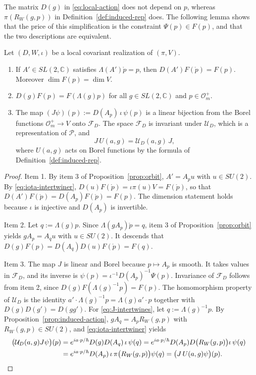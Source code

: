 The matrix $D(g)$ in \eqref{eq:local-action} does not depend on $p$, whereas $\pi(R_W(g,p))$ in Definition~\ref{def:induced-rep} does. The following lemma shows that the price of this simplification is the constraint $\Psi(p)\in F(p)$, and that the two descriptions are equivalent.

\begin{lemma}\label{lem:local-realization}
	Let $(D,W,\iota)$ be a local covariant realization of $(\pi,V)$.
	\begin{enumerate}
		\item If $A'\in SL(2,\mathbb{C})$ satisfies $\Lambda(A')\mathring{p}=p$, then $D(A')F(\mathring{p})=F(p)$. Moreover $\dim F(p)=\dim V$.
		\item $D(g)F(p)=F(\Lambda(g)p)$ for all $g\in SL(2,\mathbb{C})$ and $p\in\mathcal{O}_m^+$.
		\item The map $(J\psi)(p):=D(A_p)\,\iota\,\psi(p)$ is a linear bijection from the Borel functions $\mathcal{O}_m^+\to V$ onto $\mathcal{F}_D$. The space $\mathcal{F}_D$ is invariant under $\mathcal{U}_D$, which is a representation of $\mathcal{P}$, and
		\begin{equation}\label{eq:J-intertwines}
			J\,U(a,g)=\mathcal{U}_D(a,g)\,J,
		\end{equation}
		where $U(a,g)$ acts on Borel functions by the formula of Definition~\ref{def:induced-rep}.
	\end{enumerate}
\end{lemma}

\begin{proof}
	Item 1. By item 3 of Proposition~\ref{prop:orbit}, $A'=A_pu$ with $u\in SU(2)$. By \eqref{eq:iota-intertwiner}, $D(u)F(\mathring{p})=\iota\pi(u)V=F(\mathring{p})$, so that $D(A')F(\mathring{p})=D(A_p)F(\mathring{p})=F(p)$. The dimension statement holds because $\iota$ is injective and $D(A_p)$ is invertible.
	
	Item 2. Let $q:=\Lambda(g)p$. Since $\Lambda(gA_p)\mathring{p}=q$, item 3 of Proposition~\ref{prop:orbit} yields $gA_p=A_qu$ with $u\in SU(2)$. It descends that $D(g)F(p)=D(A_q)D(u)F(\mathring{p})=F(q)$.
	
	Item 3. The map $J$ is linear and Borel because $p\mapsto A_p$ is smooth. It takes values in $\mathcal{F}_D$, and its inverse is $\psi(p)=\iota^{-1}D(A_p)^{-1}\Psi(p)$. Invariance of $\mathcal{F}_D$ follows from item 2, since $D(g)F(\Lambda(g)^{-1}p)=F(p)$. The homomorphism property of $\mathcal{U}_D$ is the identity $a'\cdot\Lambda(g)^{-1}p=\Lambda(g)a'\cdot p$ together with $D(g)D(g')=D(gg')$. For \eqref{eq:J-intertwines}, let $q:=\Lambda(g)^{-1}p$. By Proposition~\ref{prop:induced-action}, $gA_q=A_pR_W(g,p)$ with $R_W(g,p)\in SU(2)$, and \eqref{eq:iota-intertwiner} yields
	\begin{align*}
		\big(\mathcal{U}_D(a,g)J\psi\big)(p)&=e^{ia\cdot p/\hbar}D(g)D(A_q)\,\iota\,\psi(q)=e^{ia\cdot p/\hbar}D(A_p)D\big(R_W(g,p)\big)\iota\,\psi(q)\\
		&=e^{ia\cdot p/\hbar}D(A_p)\,\iota\,\pi\big(R_W(g,p)\big)\psi(q)=\big(J\,U(a,g)\psi\big)(p).\qedhere
	\end{align*}
\end{proof}

